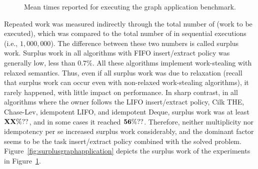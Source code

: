 \begin{figure}[!ht]

  \caption{\label{fig:graphapplication} Mean times reported for executing the graph application benchmark.}
\end{figure}

Repeated work was measured indirectly through the total number of \Puts (work to be executed), which was compared to the total number of \Puts in sequential executions (i.e., $1,000,000$). The difference between these two numbers is called surplus work. Surplus work in all algorithms with FIFO insert/extract policy was generally low, less than $0.7\%$. All these algorithms implement work-stealing with relaxed semantics. Thus, even if all surplus work was due to relaxation (recall that surplus work can occur even with non-relaxed work-stealing algorithms), it rarely happened, with little impact on performance. In sharp contrast, in all algorithms where the owner follows the LIFO insert/extract policy, Cilk THE, Chase-Lev, idempotent LIFO, and idempotent Deque, surplus work was at least $\bf XX\%??$, and in some cases it reached $\bf 56\%??$. Therefore, neither multiplicity nor idempotency per se increased surplus work considerably, and the dominant factor seems to be the task insert/extract policy combined with the solved problem. Figure~\ref{fig:surplusgraphapplication} depicts the surplus work of the experiments in Figure~\ref{fig:graphapplication}.

